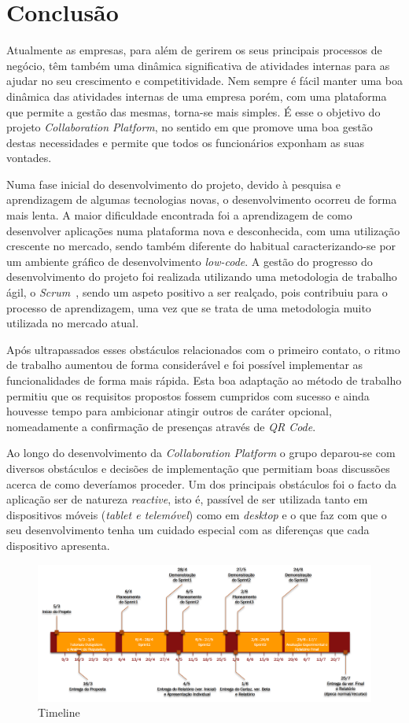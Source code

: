 \chapter{Conclusão}\label{sec:conclusion}
Atualmente as empresas, para além de gerirem os seus principais processos de negócio, têm também uma dinâmica significativa de
atividades internas para as ajudar no seu crescimento e competitividade. 
Nem sempre é fácil manter uma boa dinâmica das atividades internas de uma empresa porém, com uma plataforma que permite a gestão das mesmas, torna-se mais simples.
É esse o objetivo do projeto \textit{Collaboration Platform}, no sentido em que promove uma boa gestão destas necessidades e permite que todos os funcionários exponham as suas vontades.
\par
Numa fase inicial do desenvolvimento do projeto, devido à pesquisa e aprendizagem de algumas tecnologias novas, o desenvolvimento ocorreu de forma mais lenta. 
A maior dificuldade encontrada foi a aprendizagem de como desenvolver aplicações numa plataforma nova e desconhecida, com uma utilização crescente no mercado, sendo também diferente do habitual caracterizando-se por um ambiente gráfico de desenvolvimento \textit{low-code}. 
A gestão do progresso do desenvolvimento do projeto foi realizada utilizando uma metodologia de trabalho ágil, o \textit{Scrum~\cite{scrum}}, sendo um aspeto positivo a ser realçado, pois contribuiu para o processo de aprendizagem, uma vez que se trata de uma metodologia muito utilizada no mercado atual.
\par
Após ultrapassados esses obstáculos relacionados com o primeiro contato, o ritmo de trabalho aumentou de forma considerável e foi possível implementar as funcionalidades de forma mais rápida.
Esta boa adaptação ao método de trabalho permitiu que os requisitos propostos fossem cumpridos com sucesso e ainda houvesse tempo para ambicionar atingir outros de caráter 
opcional, nomeadamente a confirmação de presenças através de \textit{QR Code}. 
\par
Ao longo do desenvolvimento da \textit{Collaboration Platform} o grupo deparou-se com diversos obstáculos e decisões de implementação que permitiam boas discussões acerca de como deveríamos proceder.
Um dos principais obstáculos foi o facto da aplicação ser de natureza \textit{reactive}, isto é, passível de ser utilizada tanto em dispositivos móveis (\textit{tablet e telemóvel}) como em \textit{desktop} e o que faz com que o 
seu desenvolvimento tenha um cuidado especial com as diferenças que cada dispositivo apresenta.




\begin{figure}[H]
  \centering 
  \includegraphics[scale=0.5]{figures/Timeline.png}
  \caption{Timeline}\label{fig:timeline}
\end{figure}